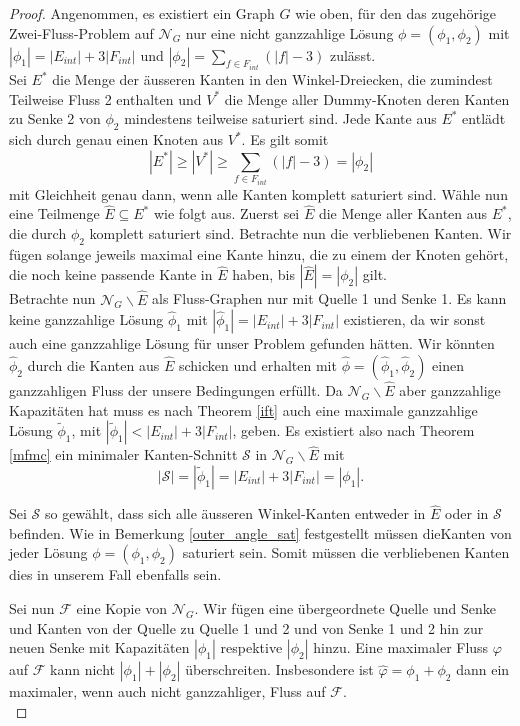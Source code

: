 \begin{proof}
Angenommen, es existiert ein Graph $G$ wie oben, für den das zugehörige Zwei-Fluss-Problem auf $\mathcal{N}_G$ nur eine nicht ganzzahlige Lösung $\phi = (\phi_1,\phi_2)$ mit $|\phi_1| = |E_{int}| + 3|F_{int}|$ und $|\phi_2| = \sum_{f \in F_{int}}{(|f|-3)}$ zulässt.\\
Sei $E^*$ die Menge der äusseren Kanten in den Winkel-Dreiecken, die zumindest Teilweise Fluss 2 enthalten und $V^*$ die Menge aller Dummy-Knoten deren Kanten zu Senke 2 von $\phi_2$ mindestens teilweise saturiert sind. Jede Kante aus $E^*$ entlädt sich durch genau einen Knoten aus $V^*$. Es gilt somit
$$|E^*| \geq |V^*| \geq \sum_{f \in F_{int}}{(|f|-3)} = |\phi_2|$$ 
mit Gleichheit genau dann, wenn alle Kanten komplett saturiert sind. Wähle nun eine Teilmenge $\hat{E} \subseteq E^*$ wie folgt aus. Zuerst sei $\hat{E}$ die Menge aller Kanten aus $E^*$, die durch $\phi_2$ komplett saturiert sind. Betrachte nun die verbliebenen Kanten. Wir fügen solange jeweils maximal eine Kante hinzu, die zu einem der Knoten gehört, die noch keine passende Kante in $\hat{E}$ haben, bis $|\hat{E}| = |\phi_2|$ gilt.\\

Betrachte nun $\mathcal{N}_G\backslash \hat{E}$ als Fluss-Graphen nur mit Quelle 1 und Senke 1. Es kann keine ganzzahlige Lösung $\hat{\phi}_1$ mit $|\hat{\phi}_1| = |E_{int}| + 3|F_{int}|$ existieren, da wir sonst auch eine ganzzahlige Lösung für unser Problem gefunden hätten. Wir könnten $\hat{\phi}_2$ durch die Kanten aus $\hat{E}$ schicken und erhalten mit $\hat{\phi} = (\hat{\phi}_1,\hat{\phi}_2)$ einen ganzzahligen Fluss der unsere Bedingungen erfüllt. Da $\mathcal{N}_G\backslash \hat{E}$ aber ganzzahlige Kapazitäten hat muss es nach Theorem \ref{ift} auch eine maximale ganzzahlige Lösung $\tilde{\phi}_1$, mit $|\tilde{\phi}_1| < |E_{int}| + 3|F_{int}|$, geben. Es existiert also nach Theorem \ref{mfmc} ein minimaler Kanten-Schnitt $\mathcal{S}$ in $\mathcal{N}_G\backslash \hat{E}$ mit $$|\mathcal{S}| = |\tilde{\phi}_1| = |E_{int}| + 3|F_{int}| = |\phi_1|.$$

Sei $\mathcal{S}$ so gewählt, dass sich alle äusseren Winkel-Kanten entweder in $\hat{E}$ oder in $\mathcal{S}$ befinden. Wie in Bemerkung \ref{outer_angle_sat} festgestellt müssen dieKanten von jeder Lösung $\phi = (\phi_1,\phi_2)$ saturiert sein. Somit müssen die verbliebenen Kanten dies in unserem Fall ebenfalls sein.

Sei nun $\mathcal{F}$ eine Kopie von $\mathcal{N}_G$. Wir fügen eine übergeordnete Quelle und Senke und Kanten von der Quelle zu Quelle 1 und 2 und von Senke 1 und 2 hin zur neuen Senke mit Kapazitäten $|\phi_1|$ respektive $|\phi_2|$ hinzu. Eine maximaler Fluss $\varphi$ auf $\mathcal{F}$ kann nicht $|\phi_1| + |\phi_2|$ überschreiten. Insbesondere ist $ \hat{\varphi} = \phi_1 + \phi_2 $ dann ein maximaler, wenn auch nicht ganzzahliger, Fluss auf $\mathcal{F}$.\\


\end{proof}
